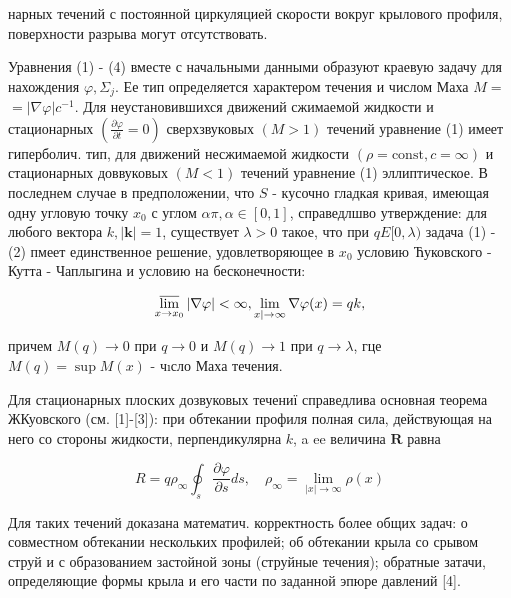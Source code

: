 \documentclass[10pt]{article}
\begin{document}
нарных течений с постоянной циркуляцией скорости вокруг крылового профиля, поверхности разрыва могут отсутствовать.



Уравнения (1) - (4) вместе с начальными данными образуют краевую задачу для нахождения $\varphi, \Sigma_{j}$. Ее тип определяется характером течения и числом Маха $M=$ $=|\nabla \varphi| c^{-1}$. Для неустановившихся движений сжимаемой жидкости и стационарных $\left(\frac{\partial \varphi}{\partial t}=0\right)$ сверхзвуковых $(M>1)$ течений уравнение (1) имеет гиперболич. тип, для движений несжимаемой жидкости $(\rho=\mathrm{const}, c=\infty)$ и стационарных доввуковых $(M<1)$ течений уравнение (1) эллиптическое. В последнем случае в предположении, что $S$ - кусочно гладкая кривая, имеющая одну угловую точку $x_{0}$ с углом $\alpha \pi, \alpha \in[0,1]$, справедлшво утверждение: для любого вектора $k,|\boldsymbol{k}|=1$, существует $\lambda>0$ такое, что при $q E[0, \lambda)$ задача (1) - (2) пмеет единственное решение, удовлетворяющее в $x_{0}$ условию Ћуковского - Кутта - Чаплыгина и условию на бесконечности:



\[

\varlimsup_{x \rightarrow x_{0}}|\nabla \varphi|<\infty, \lim _{x \mid \rightarrow \infty} \nabla \varphi(x)=q k,

\]



причем $M(q) \rightarrow 0$ при $q \rightarrow 0$ и $M(q) \rightarrow 1$ при $q \rightarrow \lambda$, гце $M(q)=\sup M(x)$ - чıсло Маха течения.



Для стационарных плоских дозвуковых течениї справедлива основная теорема ЖКуовского (см. [1]-[3]): при обтекании профиля полная сила, действующая на него со стороны жидкости, перпендикулярна $k$, a ee величина $\boldsymbol{R}$ равна



\[

R=q \rho_{\infty} \oint_{s} \frac{\partial \varphi}{\partial s} d s, \quad \rho_{\infty}=\lim _{|x| \rightarrow \infty} \rho(x)

\]



Для таких течений доказана математич. корректность более общих задач: о совместном обтекании нескольких профилей; об обтекании крыла со срывом струй и с образованием застойной зоны (струйные течения); обратные затачи, определяющие формы крыла и его части по заданной эпюре давлений [4].
\end{document}
